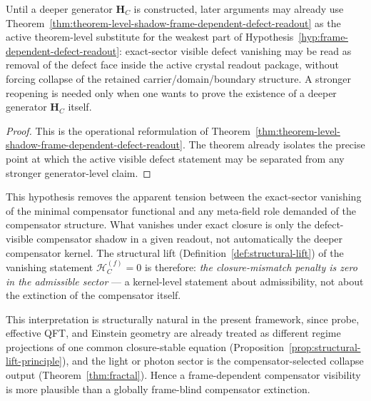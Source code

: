 \begin{corollary}
\label{cor:operational-reading-hypothesis-75-crystal-language}
Until a deeper generator $\mathbf H_C$ is constructed, later arguments may already use Theorem~\ref{thm:theorem-level-shadow-frame-dependent-defect-readout} as the active theorem-level substitute for the weakest part of Hypothesis~\ref{hyp:frame-dependent-defect-readout}: exact-sector visible defect vanishing may be read as removal of the defect face inside the active crystal readout package, without forcing collapse of the retained carrier/domain/boundary structure. A stronger reopening is needed only when one wants to prove the existence of a deeper generator $\mathbf H_C$ itself.
\end{corollary}

\begin{proof}
This is the operational reformulation of Theorem~\ref{thm:theorem-level-shadow-frame-dependent-defect-readout}. The theorem already isolates the precise point at which the active visible defect statement may be separated from any stronger generator-level claim.
\end{proof}


\begin{remark}
This hypothesis removes the apparent tension between the exact-sector
vanishing of the minimal compensator functional and any meta-field role
demanded of the compensator structure. What vanishes under exact closure
is only the defect-visible compensator shadow in a given readout, not
automatically the deeper compensator kernel. The structural lift
(Definition~\ref{def:structural-lift}) of the vanishing statement
$\mathcal{H}_C^{(f)} = 0$ is therefore: \emph{the closure-mismatch
penalty is zero in the admissible sector} --- a kernel-level statement
about admissibility, not about the extinction of the compensator itself.
\end{remark}

\begin{remark}
This interpretation is structurally natural in the present framework,
since probe, effective QFT, and Einstein geometry are already treated as
different regime projections of one common closure-stable equation
(Proposition~\ref{prop:structural-lift-principle}), and the light or
photon sector is the compensator-selected collapse output
(Theorem~\ref{thm:fractal}). Hence a frame-dependent compensator
visibility is more plausible than a globally frame-blind compensator
extinction.
\end{remark}

